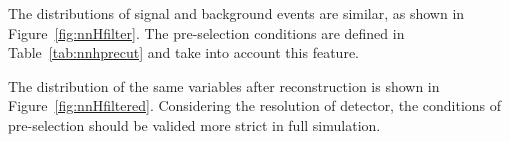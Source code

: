 \documentclass[11pt,a4paper]{cepcnote}
\begin{document}
The distributions of signal and background events are similar, as shown in
Figure~\ref{fig:nnHfilter}. The pre-selection conditions are defined in
Table~\ref{tab:nnhprecut} and take into account this feature.

The distribution of the same variables after reconstruction is shown in
Figure~\ref{fig:nnHfiltered}.
{\color{blue} Considering the resolution of detector, the conditions of pre-selection should be valided more strict in full simulation.}

\end{document}
